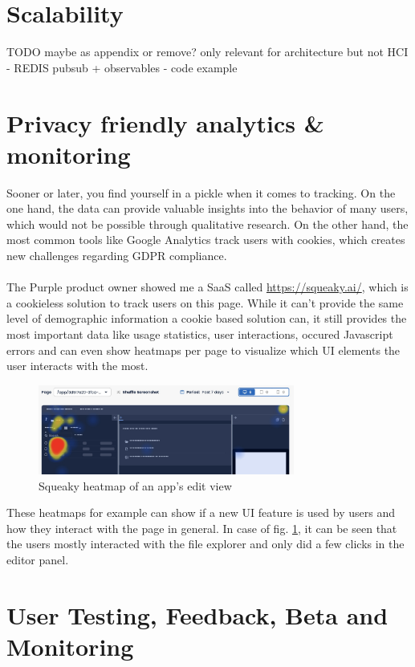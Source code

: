 \section{Scalability}

TODO maybe as appendix or remove? only relevant for architecture but not HCI
- REDIS pubsub + observables
- code example

\section{Privacy friendly analytics \& monitoring}

Sooner or later, you find yourself in a pickle when it comes to tracking.
On the one hand, the data can provide valuable insights into the behavior of many users, which would not be possible through qualitative research.
On the other hand, the most common tools like Google Analytics track users with cookies, which creates new challenges regarding GDPR compliance.
\\\\
The Purple product owner showed me a SaaS called \url{https://squeaky.ai/}, which is a cookieless solution to track users on this page.
While it can't provide the same level of demographic information a cookie based solution can, it still provides the most important data like usage statistics,
user interactions, occured Javascript errors and can even show heatmaps per page to visualize which UI elements the user interacts with the most.

\begin{figure}[h]
  \centering
  \includegraphics[width=0.75\textwidth]{pics/squeaky_heatmap.jpg}
  \caption{Squeaky heatmap of an app's edit view}
  \label{fig:squeaky}
\end{figure}

These heatmaps for example can show if a new UI feature is used by users and how they interact with the page in general.
In case of fig. \ref{fig:squeaky}, it can be seen that the users mostly interacted with the file explorer and only did a few clicks in the editor panel.

\section{User Testing, Feedback, Beta and Monitoring}

